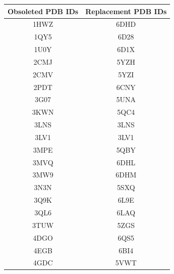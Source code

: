 \documentclass[journal=jcisd8,manuscript=article]{achemso}
\begin{document}
\begin{center}
    \begin{table}[ht]
        \centering
        \begin{tabular}{|c|c|}
            \hline
            \textbf{Obsoleted PDB IDs} & \textbf{Replacement PDB IDs} \\
            \hline
            1HWZ                       & 6DHD                         \\
            1QY5                       & 6D28                         \\
            1U0Y                       & 6D1X                         \\
            2CMJ                       & 5YZH                         \\
            2CMV                       & 5YZI                         \\
            2PDT                       & 6CNY                         \\
            3G07                       & 5UNA                         \\
            3KWN                       & 5QC4                         \\
            3LNS                       & 3LNS                         \\
            3LV1                       & 3LV1                         \\
            3MPE                       & 5QBY                         \\
            3MVQ                       & 6DHL                         \\
            3MW9                       & 6DHM                         \\
            3N3N                       & 5SXQ                         \\
            3Q9K                       & 6L9E                         \\
            3QL6                       & 6LAQ                         \\
            3TUW                       & 5ZGS                         \\
            4DGO                       & 6QS5                         \\
            4EGB                       & 6BI4                         \\
            4GDC                       & 5VWT                         \\

\end{tabular}
\end{table}
\end{center}
\end{document}
